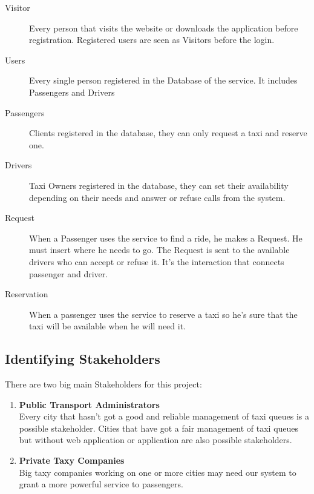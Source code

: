 \begin{description}
	\item[Visitor] Every person that visits the website or downloads the application before registration. Registered users are seen as Visitors before the login.
	\item[Users] Every single person registered in the Database of the service. It includes Passengers and Drivers
	\item[Passengers] Clients registered in the database, they can only request a taxi and reserve one.  
	\item[Drivers]	Taxi Owners registered in the database, they can set their availability depending on their needs and answer or refuse calls from the system.
	\item[Request] When a Passenger uses the service to find a ride, he makes a Request. He must insert where he needs to go. The Request is sent to the available drivers who can accept or refuse it. It's the 			interaction that connects passenger and driver. 
	\item[Reservation] When a passenger uses the service to reserve a taxi so he's sure that the taxi will be available when he will need it.
	
\end{description}

\subsection{Identifying Stakeholders}

There are two big main Stakeholders for this project:
\begin{enumerate}
	\item \textbf{Public Transport Administrators} \\
	Every city that hasn't got a good and reliable management of taxi queues is a possible stakeholder.  Cities that have got a fair management of taxi queues but without web application or application are also possible stakeholders.
	\item \textbf{Private Taxy Companies} \\
	Big taxy companies working on one or more cities may need our system to grant a more powerful service to passengers.
\end{enumerate}	